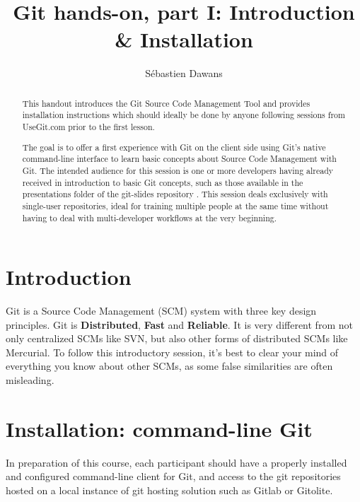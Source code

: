 \documentclass{../common/tufte-latex/tufte-handout}
\title{Git hands-on, part I: Introduction \& Installation}
\author{S\'ebastien Dawans}
\begin{document}
\maketitle%

\begin{abstract}
\noindent
This handout introduces the Git Source Code Management Tool and provides installation instructions which should ideally be done by anyone following sessions from UseGit.com  prior to the first lesson.

The goal is to offer a first experience with Git on the client side using Git's native command-line interface to learn basic concepts about Source Code Management with Git.
The intended audience for this session is one or more developers having already received in introduction to basic Git concepts, such as those available in the presentations folder of the git-slides repository .
This session deals exclusively with single-user repositories, ideal for training multiple people at the same time without having to deal with multi-developer workflows at the very beginning.
\end{abstract}


\section{Introduction}\label{sec:intro}

Git is a Source Code Management (SCM) system with three key design principles.
Git is \textbf{Distributed}, \textbf{Fast} and \textbf{Reliable}.
It is very different from not only centralized SCMs like SVN, but also other forms of distributed SCMs like Mercurial.
To follow this introductory session, it's best to clear your mind of everything you know about other SCMs, as some false similarities are often misleading.

\section{Installation: command-line Git}

In preparation of this course, each participant should have a properly installed and configured command-line client for Git, and access to the git repositories hosted on a local instance of git hosting solution such as Gitlab or Gitolite.
\end{document}

